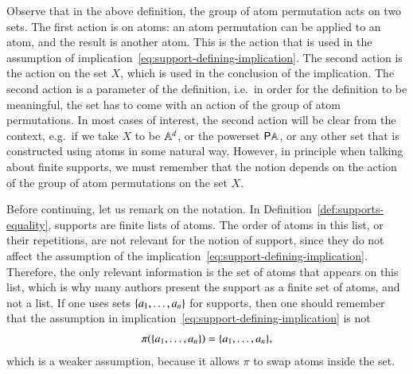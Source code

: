 Observe that in the above definition, the group of atom permutation acts on two sets. The first action is on atoms: an atom permutation can be applied to an atom, and the result is another atom. This is the action that is used in the assumption of implication~\eqref{eq:support-defining-implication}. The second action is the action on the set $X$, which is used in the conclusion of the implication. The second action is a parameter of the definition, i.e.~in order for the definition to be meaningful, the set has to come with an action of the group of atom permutations. In most cases of interest, the second action will be clear from the context, e.g.~if we take $X$ to be $\mathbb A^d$, or the powerset ${\mathsf P} \mathbb A$, or any other set that is constructed using atoms in some natural way. However, in principle when talking about finite supports, we must remember that the notion depends on the action of the group of atom permutations on the set $X$.

Before continuing, let us remark on the notation. In Definition~\ref{def:supports-equality}, supports are finite lists of atoms. The order of atoms in this list, or their repetitions, are not relevant for the notion of support, since they do not affect the assumption of the implication~\eqref{eq:support-defining-implication}. Therefore, the only relevant information is the set of atoms that appears on this list, which is why many authors present the support as a  finite set of atoms, and not a list. If one uses sets $\{a_1,\ldots,a_n\}$ for supports, then one should remember that the assumption in implication~\eqref{eq:support-defining-implication} is not
\begin{align*}
    \pi(\{a_1,\ldots,a_n\}) = \{a_1,\ldots,a_n\},
\end{align*}
which is a weaker assumption, because it allows $\pi$ to swap atoms inside the set.



